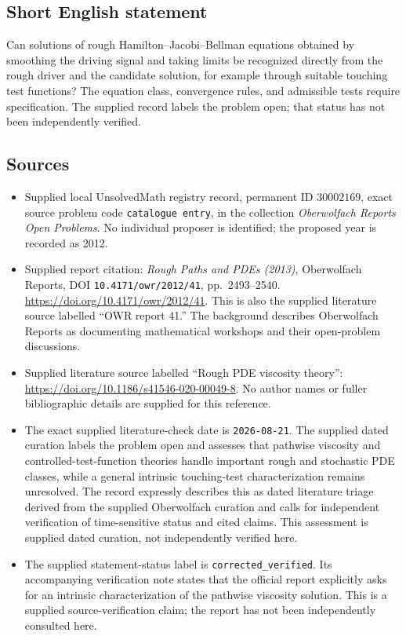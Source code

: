 \documentclass[11pt]{article}
\begin{document}
\subsection{Short English statement}
Can solutions of rough Hamilton--Jacobi--Bellman equations obtained by smoothing the driving signal and taking limits be recognized directly from the rough driver and the candidate solution, for example through suitable touching test functions? The equation class, convergence rules, and admissible tests require specification. The supplied record labels the problem open; that status has not been independently verified.
\subsection{Sources}
\begin{itemize}
\item Supplied local UnsolvedMath registry record, permanent ID \(30002169\), exact source problem code \texttt{catalogue entry}, in the collection \emph{Oberwolfach Reports Open Problems}. No individual proposer is identified; the proposed year is recorded as 2012.
\item Supplied report citation: \emph{Rough Paths and PDEs (2013)}, Oberwolfach Reports, DOI \texttt{10.4171/owr/2012/41}, pp.\ 2493--2540. \url{https://doi.org/10.4171/owr/2012/41}. This is also the supplied literature source labelled ``OWR report 41.'' The background describes Oberwolfach Reports as documenting mathematical workshops and their open-problem discussions.
\item Supplied literature source labelled ``Rough PDE viscosity theory'': \url{https://doi.org/10.1186/s41546-020-00049-8}. No author names or fuller bibliographic details are supplied for this reference.
\item The exact supplied literature-check date is \texttt{2026-08-21}. The supplied dated curation labels the problem open and assesses that pathwise viscosity and controlled-test-function theories handle important rough and stochastic PDE classes, while a general intrinsic touching-test characterization remains unresolved. The record expressly describes this as dated literature triage derived from the supplied Oberwolfach curation and calls for independent verification of time-sensitive status and cited claims. This assessment is supplied dated curation, not independently verified here.
\item The supplied statement-status label is \texttt{corrected\_verified}. Its accompanying verification note states that the official report explicitly asks for an intrinsic characterization of the pathwise viscosity solution. This is a supplied source-verification claim; the report has not been independently consulted here.
\end{itemize}
\end{document}
